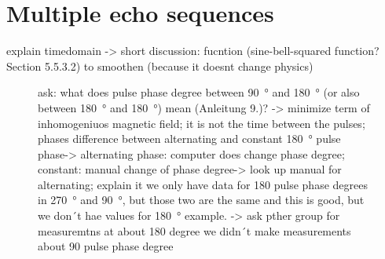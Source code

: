 \section{Multiple echo sequences}

explain timedomain -> short discussion: fucntion (sine-bell-squared function? Section 5.5.3.2) to smoothen (because it doesnt change physics)
%     
\begin{figure}[H]
    \centering
    
    \caption[]{ask: what does pulse phase degree between \SI{90}{\degree} and \SI{180}{\degree} (or also between \SI{180}{\degree} and \SI{180}{\degree}) mean (Anleitung 9.)? -> minimize term of inhomogeniuos magnetic field; it is not the time between the pulses; phases\newline
    difference between alternating and constant \SI{180}{\degree} pulse phase-> alternating phase: computer does change phase degree; constant: manual change of phase degree-> look up manual for alternating; explain it\newline
    we only have data for 180 pulse phase degrees in \SI{270}{\degree} and \SI{90}{\degree}, but those two are the same and this is good, but we don´t hae values for \SI{180}{\degree} example. -> ask pther group for measuremtns at about 180 degree\newline
    we didn´t make measurements about 90 pulse phase degree}
    \label{fig:180pulsephasedegree}
\end{figure}
